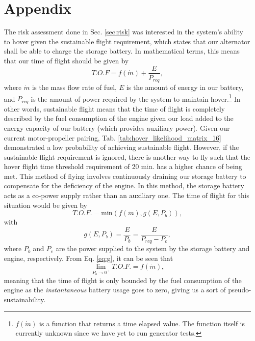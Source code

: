 \documentclass{article}
\begin{document}
\section{Appendix}\label{sec:appendix}
The risk assessment done in Sec. \ref{sec:risk} was interested in the system's ability to hover given the sustainable flight requirement, which states that our alternator shall be able to charge the storage battery. In mathematical terms, this means that our time of flight should be given by 
\begin{equation}
    T.O.F = f(\dot{m}) + \frac{E}{P_{req}},
\end{equation}
where $\dot{m}$ is the mass flow rate of fuel, $E$ is the amount of energy in our battery, and $P_{req}$ is the amount of power required by the system to maintain hover.\footnote{$f(\dot{m})$ is a function that returns a time elapsed value. The function itself is currently unknown since we have yet to run generator tests.} In other words, sustainable flight means that the time of flight is completely described by the fuel consumption of the engine given our load added to the energy capacity of our battery (which provides auxiliary power). Given our current motor-propeller pairing, Tab. \ref{tab:hover_likelihood_matrix_16} demonstrated a low probability of achieving sustainable flight. However, if the sustainable flight requirement is ignored, there is another way to fly such that the hover flight time threshold requirement of 20 min. has a higher chance of being met. This method of flying involves continuously draining our storage battery to compensate for the deficiency of the engine. In this method, the storage battery acts as a co-power supply rather than an auxiliary one. The time of flight for this situation would be given by 
\begin{equation}
    T.O.F. = \text{min}(f(\dot{m}), g(E, P_{b})),
\end{equation}
with 
\begin{equation}\label{eq:g}
    g(E, P_{b}) = \frac{E}{P_{b}} = \frac{E}{P_{req} - P_{e}},
\end{equation}
where $P_{b}$ and $P_e$ are the power supplied to the system by the storage battery and engine, respectively. From Eq. \ref{eq:g}, it can be seen that
\begin{equation}\label{eq:lim}
    \lim_{P_b \to 0^+} T.O.F. = f(\dot{m}),
\end{equation}
meaning that the time of flight is only bounded by the fuel consumption of the engine as the \textit{instantaneous} battery usage goes to zero, giving us a sort of pseudo-sustainability. 
\end{document}
